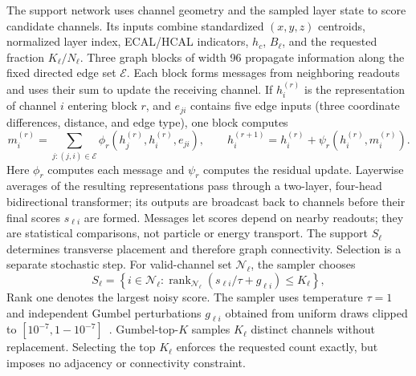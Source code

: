 \documentclass[11pt]{article}
\begin{document}
The support network uses channel geometry and the sampled layer state to score candidate channels. Its inputs combine standardized $(x,y,z)$ centroids, normalized layer index, ECAL/HCAL indicators, $h_c$, $B_\ell$, and the requested fraction $K_\ell/N_\ell$. Three graph blocks of width 96 propagate information along the fixed directed edge set $\mathcal E$. Each block forms messages from neighboring readouts and uses their sum to update the receiving channel. If $h_i^{(r)}$ is the representation of channel $i$ entering block $r$, and $e_{ji}$ contains five edge inputs (three coordinate differences, distance, and edge type), one block computes
\begin{equation}
 m_i^{(r)}=\sum_{j:(j,i)\in\mathcal E}
 \phi_r(h_j^{(r)},h_i^{(r)},e_{ji}),\qquad
 h_i^{(r+1)}=h_i^{(r)}+\psi_r(h_i^{(r)},m_i^{(r)}).
 \label{eq:message}
\end{equation}
Here $\phi_r$ computes each message and $\psi_r$ computes the residual update. Layerwise averages of the resulting representations pass through a two-layer, four-head bidirectional transformer; its outputs are broadcast back to channels before their final scores $s_{\ell i}$ are formed. Messages let scores depend on nearby readouts; they are statistical comparisons, not particle or energy transport. The support $S_\ell$ determines transverse placement and therefore graph connectivity. Selection is a separate stochastic step. For valid-channel set $\mathcal N_\ell$, the sampler chooses
\begin{equation}
 S_\ell=\left\{i\in\mathcal N_\ell:
 \operatorname{rank}_{\mathcal N_\ell}(s_{\ell i}/\tau+g_{\ell i})\leq K_\ell\right\},
 \label{eq:topk}
\end{equation}
Rank one denotes the largest noisy score. The sampler uses temperature $\tau=1$ and independent Gumbel perturbations $g_{\ell i}$ obtained from uniform draws clipped to $[10^{-7},1-10^{-7}]$~\cite{gumbeltopk}. Gumbel-top-$K$ samples $K_\ell$ distinct channels without replacement. Selecting the top $K_\ell$ enforces the requested count exactly, but imposes no adjacency or connectivity constraint.
\end{document}
